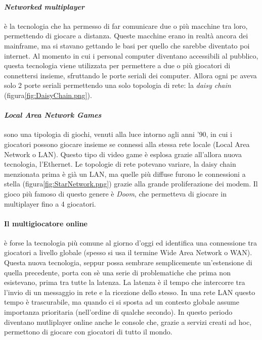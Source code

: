         \paragraph{\textit{Networked multiplayer}} è la tecnologia che ha permesso di far comunicare due o più macchine tra loro, permettendo di giocare a distanza. Queste macchine
            erano in realtà ancora dei mainframe, ma si stavano gettando le basi per quello che sarebbe diventato poi internet. Al momento in cui i personal computer diventano
            accessibili al pubblico, questa tecnologia viene utilizzata per permettere a due o più giocatori di connettersi insieme, sfruttando le porte seriali dei computer. 
            Allora ogni pc aveva solo 2 porte seriali permettendo una solo topologia di rete: la \textit{daisy chain} (figura\ref{fig:DaisyChain.png}).
 
        \paragraph{\textit{Local Area Network Games}} sono una tipologia di giochi, venuti alla luce intorno agli anni '90, in cui i giocatori possono giocare insieme se connessi alla stessa
            rete locale (Local Area Network o LAN). Questo tipo di video game è esplosa grazie all'allora nuova tecnologia, l'Ethernet. Le topologie di rete potevano variare,
            la daisy chain menzionata prima è già un LAN, ma quelle più diffuse furono le connessioni a stella (figura\ref{fig:StarNetwork.png}) grazie alla grande proliferazione
            dei modem. Il gioco più famoso di questo genere è \textit{Doom}, che permetteva di giocare in multiplayer fino a 4 giocatori.

        \paragraph{Il multigiocatore online} è forse la tecnologia più comune al giorno d'oggi ed identifica una connessione tra giocatori a livello globale (spesso si usa il termine
            Wide Area Network o WAN). Questa nuova tecnologia, seppur possa sembrare semplicemente un'estensione di quella precedente, porta con sè una serie di problematiche
            che prima non esistevano, prima tra tutte la latenza. La latenza è il tempo che intercorre tra l'invio di un messaggio in rete e la ricezione dello stesso. In una rete
            LAN questo tempo è trascurabile, ma quando ci si sposta ad un contesto globale assume importanza prioritaria (nell'ordine di qualche secondo). In questo periodo diventano
            mutliplayer online anche le console che, grazie a servizi creati ad hoc, permettono di giocare con giocatori di tutto il mondo. 
        
